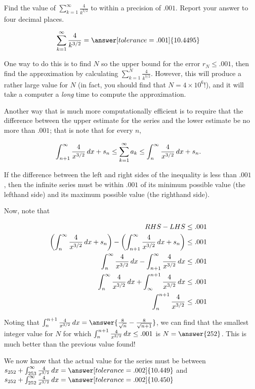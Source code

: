 \documentclass{ximera}
\begin{document}
\begin{exercise}
\begin{exercise}
Find the value of $\sum_{k=1}^{\infty} \frac{4}{k^{3/2}}$ to within a precision of $.001$.  Report your answer to four decimal places.

\[
\sum_{k=1}^{\infty} \frac{4}{k^{3/2}} = \answer[tolerance=.001]{10.4495}
\]

\begin{hint}
One way to do this is to find $N$ so the upper bound for the error $r_N \leq .001$, then find the approximation by calculating $\sum_{k=1}^{N} \frac{4}{k^{3/2}}$.  However, this will produce a rather large value for $N$ (in fact, you should find that $N=4 \times 10^6$!), and it will take a computer a \emph{long} time to compute the approximation.  

Another way that is much more computationally efficient is to require that the difference between the upper estimate for the series and the lower estimate be no more than $.001$; that is note that for every $n$,

\[
\int_{n+1}^\infty \frac{4}{x^{3/2}} \mathop{}\!d x  +s_n \leq \sum_{k=1}^{\infty} a_k \leq \int_{n}^\infty \frac{4}{x^{3/2}} \mathop{}\!d x  +s_n.
\]
 
If the difference between the left and right sides of the inequality is less than $.001$, then the infinite series must be within $.001$ of its minimum possible value (the lefthand side) and its maximum possible value (the righthand side).
 
 Now, note that

\begin{align*}
RHS-LHS &\leq .001 \\
\left( \int_{n}^\infty \frac{4}{x^{3/2}} \mathop{}\!d x  +s_n\right) - \left( \int_{n+1}^\infty \frac{4}{x^{3/2}} \mathop{}\!d x  +s_n \right) &\leq .001 \\
 \int_{n}^\infty \frac{4}{x^{3/2}} \mathop{}\!d x  - \int_{n+1}^\infty \frac{4}{x^{3/2}} \mathop{}\!d x   &\leq .001 \\
  \int_{n}^\infty \frac{4}{x^{3/2}} \mathop{}\!d x  +  \int_{\infty}^{n+1} \frac{4}{x^{3/2}} \mathop{}\!d x   &\leq .001 \\
    \int_{n}^{n+1} \frac{4}{x^{3/2}}  &\leq .001 \\
\end{align*} 

Noting that $\int_n^{n+1}  \frac{4}{x^{3/2}} \d x = \answer{\frac{8}{\sqrt{n}} - \frac{8}{\sqrt{n+1}}}$, we can find that the smallest integer value for $N$ for which $\int_n^{n+1}  \frac{4}{x^{3/2}} \mathop{}\!d x \leq .001$ is $N= \answer{252}$.  This is much better than the previous value found!
 
 We now know that the actual value for the series must be between $s_{252} + \int_{253}^\infty \frac{4}{x^{3/2}} \d x = \answer[tolerance=.002]{10.449}$ and $s_{252} + \int_{252}^\infty \frac{4}{x^{3/2}} \d x = \answer[tolerance=.002]{10.450}$
\end{hint}

\end{exercise}
\end{exercise}
\end{document}
